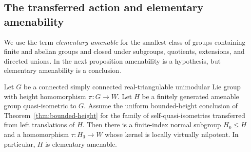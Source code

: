 \subsection{The transferred action and elementary amenability}

We use the term \emph{elementary amenable} for the smallest class of
groups containing finite and abelian groups and closed under subgroups,
quotients, extensions, and directed unions.  In the next proposition
amenability is a hypothesis, but elementary amenability is a conclusion.

\begin{proposition}\label{prop:recognition-from-height}
Let $G$ be a connected simply connected real-triangulable unimodular Lie
group with height homomorphism $\pi:G\to W$.  Let $H$ be a finitely
generated amenable group quasi-isometric to $G$.  Assume the uniform
bounded-height conclusion of Theorem~\ref{thm:bounded-height} for the
family of self-quasi-isometries transferred from left translations of
$H$.  Then there is a finite-index normal subgroup $H_0\leq H$ and a
homomorphism $\tau:H_0\to W$ whose kernel is locally virtually
nilpotent.  In particular, $H$ is elementary amenable.
\end{proposition}

